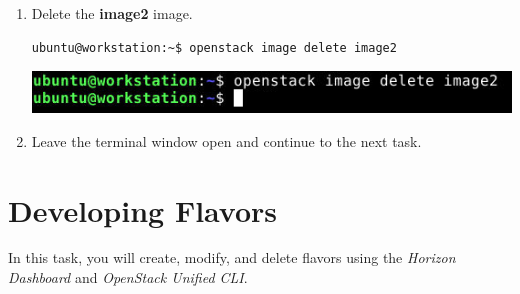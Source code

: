 \documentclass[letterpaper, 12pt]{article}
\begin{document}
\begin{enumerate}
    \item Delete the \textbf{image2} image.
\begin{lstlisting}
ubuntu@workstation:~$ openstack image delete image2
\end{lstlisting}

    \begin{center}
        \includegraphics[width=\linewidth]{images/part1/step18.png}
    \end{center}

    \item Leave the terminal window open and continue to the next task.

\end{enumerate}

\section{Developing Flavors}
\label{sec:developing_flavors}
In this task, you will create, modify, and delete flavors using the \textit{Horizon Dashboard} and
\textit{OpenStack Unified CLI}.
\end{document}
